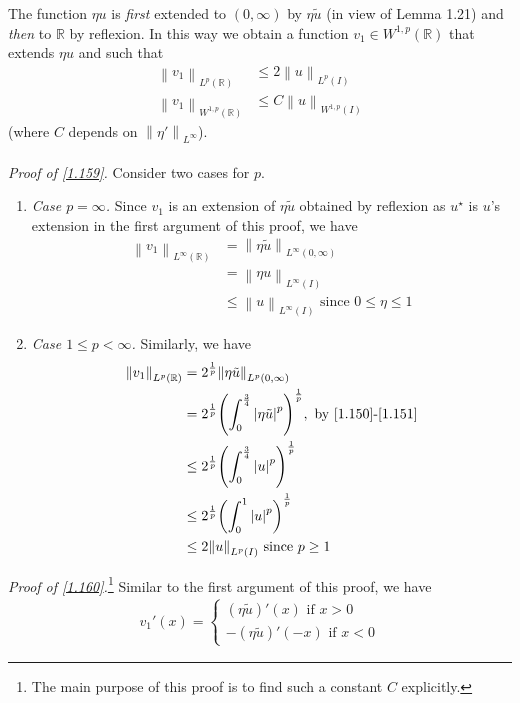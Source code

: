 \documentclass[a4paper,oneside]{book}
\numberwithin{equation}{chapter}
\begin{document}
The function $\eta u$ is \textit{first} extended to $\left(0,\infty\right)$ by $\eta \tilde{u}$ (in view of Lemma 1.21) and \textit{then} to $\mathbb{R}$ by reflexion. In this way we obtain a function $v_1\in W^{1,p}\left(\mathbb{R}\right)$ that extends $\eta u$ and such that
\begin{align}
\label{1.159}
{\left\| {{v_1}} \right\|_{{L^p}\left( \mathbb{R} \right)}} &\le 2{\left\| u \right\|_{{L^p}\left( I \right)}}\\
{\left\| {{v_1}} \right\|_{{W^{1,p}}\left( \mathbb{R} \right)}} &\le C{\left\| u \right\|_{{W^{1,p}}\left( I \right)}} \label{1.160}
\end{align}
(where $C$ depends on ${{{\left\| {\eta '} \right\|}_{{L^\infty }}}}$).\\
\\
\textit{Proof of \eqref{1.159}.} Consider two cases for $p$.
\begin{enumerate}
\item \textit{Case $p=\infty$.} Since $v_1$ is an extension of $\eta \tilde{u}$ obtained by reflexion as $u^{\star}$ is $u$'s extension in the first argument of this proof, we have 
\begin{align}
{\left\| {{v_1}} \right\|_{{L^\infty }\left( \mathbb{R} \right)}} &= {\left\| {\eta \tilde u} \right\|_{{L^\infty }\left( {0,\infty } \right)}}\\
 &= {\left\| {\eta u} \right\|_{{L^\infty }\left( I \right)}}\\
 &\le {\left\| u \right\|_{{L^\infty }\left( I \right)}}\mbox{ since } 0 \le \eta  \le 1
\end{align}
\item \textit{Case $1\le p <\infty$.}
Similarly, we have 
\begin{align}
{\left\| {{v_1}} \right\|_{{L^p}\left( \mathbb{R} \right)}} &= {2^{\frac{1}{p}}}{\left\| {\eta \tilde u} \right\|_{{L^p}\left( {0,\infty } \right)}}\\
& = {2^{\frac{1}{p}}}{\left( {\int_0^{\frac{3}{4}} {{{\left| {\eta \tilde u} \right|}^p}} } \right)^{\frac{1}{p}}},\mbox{ by \eqref{1.150}-\eqref{1.151}}\\
 &\le {2^{\frac{1}{p}}}{\left( {\int_0^{\frac{3}{4}} {{{\left| u \right|}^p}} } \right)^{\frac{1}{p}}}\\
 &\le {2^{\frac{1}{p}}}{\left( {\int_0^1 {{{\left| u \right|}^p}} } \right)^{\frac{1}{p}}}\\
 &\le 2{\left\| u \right\|_{{L^p}\left( I \right)}}\mbox{ since } p \ge 1
\end{align}
\end{enumerate}
\textit{Proof of \eqref{1.160}.}\footnote{The main purpose of this proof is to find such a constant $C$ explicitly.} Similar to the first argument of this proof, we have
\begin{align}
{v_1}'\left( x \right) = \left\{ {\begin{array}{*{20}{c}}
{\left( {\eta \tilde u} \right)'\left( x \right)\mbox{ if } x > 0}\\
{ - \left( {\eta \tilde u} \right)'\left( { - x} \right)\mbox{ if } x < 0}
\end{array}} \right.
\end{align}
\end{document}
